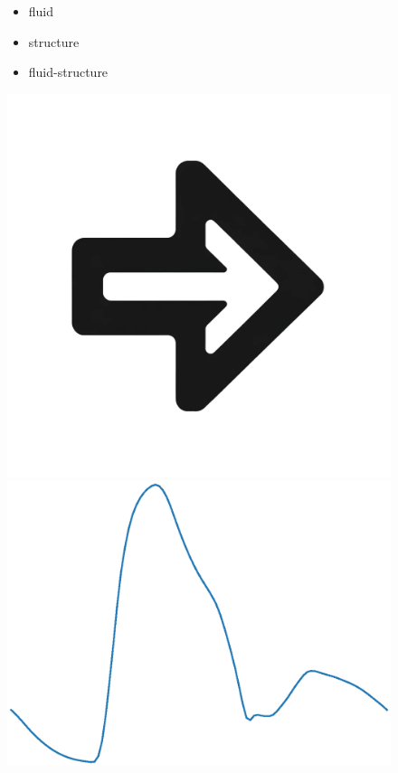 \documentclass{beamer}
\begin{document}
\begin{frame}
\begin{figure}[htbp]
\begin{minipage}[c][0.35\paperheight][c]{\linewidth}
\begin{minipage}{0.19\linewidth}
				{\footnotesize
					\begin{itemize} 
						\item fluid 
						\item structure 
						\item fluid-structure
				\end{itemize}}
		\end{minipage}
			\begin{minipage}{0.1\linewidth}
				\includegraphics[width=\linewidth]{images/right_arrow.png}
			\end{minipage}
			\begin{minipage}{0.19\linewidth}
				\includegraphics[width=\linewidth]{images/adan56_tibiofibular_trunk_L_P.eps}

\end{minipage}
\end{minipage}
\end{figure}
\end{frame}
\end{document}
